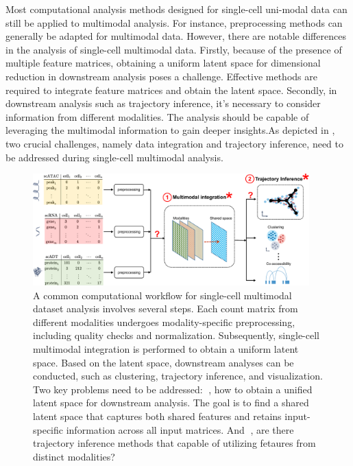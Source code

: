 Most computational analysis methods designed for single-cell uni-modal data can still be applied to multimodal analysis. For instance, preprocessing methods can generally be adapted for multimodal data. However, there are notable differences in the analysis of single-cell multimodal data. Firstly, because of the presence of multiple feature matrices, obtaining a uniform latent space for dimensional reduction in downstream analysis poses a challenge. Effective methods are required to integrate feature matrices and obtain the latent space. Secondly, in downstream analysis such as trajectory inference, it's necessary to consider information from different modalities. The analysis should be capable of leveraging the multimodal information to gain deeper insights.As depicted in , two crucial challenges, namely data integration and trajectory inference, need to be addressed during single-cell multimodal analysis.

 
\begin{figure}[!ht]
	\centering
	\includegraphics[width=0.95\textwidth]{workflow_multimodal/fig}
	\vspace{0.1cm}
	\caption[A common computational multimodal analysis workflow.]{A common computational workflow for single-cell multimodal dataset analysis involves several steps. Each count matrix from different modalities undergoes modality-specific preprocessing, including quality checks and normalization. Subsequently, single-cell multimodal integration is performed to obtain a uniform latent space. Based on the latent space, downstream analyses can be conducted, such as clustering, trajectory inference, and visualization. Two key problems need to be addressed: \textcircled{}, how to obtain a unified latent space for downstream analysis. The goal is to find a shared latent space that captures both shared features and retains input-specific information across all input matrices. And \textcircled{}, are there trajectory inference methods that capable of utilizing fetaures from distinct modalities?}
	\label{fig:workflow_multimodal}
\end{figure}

